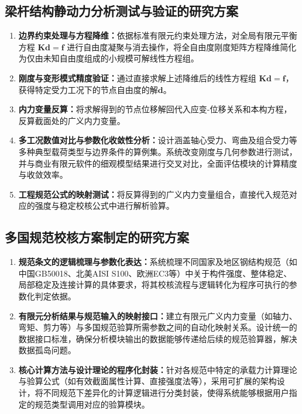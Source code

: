\subsection{梁杆结构静动力分析测试与验证的研究方案}
\begin{enumerate}[label=\arabic*., leftmargin=2em]
    \item \textbf{边界约束处理与方程降维：}依据标准有限元约束处理方法，对全局有限元平衡方程 \(\mathbf{K}\mathbf{d} = \mathbf{f}\) 进行自由度凝聚与消去操作，将全自由度刚度矩阵方程降维简化为仅由未知自由度组成的小规模可解线性方程组。
    \item \textbf{刚度与变形模式精度验证：}通过直接求解上述降维后的线性方程组 \(\mathbf{K}\mathbf{d} = \mathbf{f}\)，获得特定受力工况下的节点自由度的解\(\mathbf{d}\)。
    \item \textbf{内力变量反算：}将求解得到的节点位移解回代入应变-位移关系和本构方程，反算截面处的广义内力变量。
    \item \textbf{多工况数值对比与参数化收敛性分析：}设计涵盖轴心受力、弯曲及组合受力等多种典型载荷类型与边界条件的算例集。系统改变刚度与几何参数进行测试，并与商业有限元软件的细观模型结果进行交叉对比，全面评估模块的计算精度与收敛效率。
    \item \textbf{工程规范公式的映射测试：}将反算得到的广义内力变量组合，直接代入规范对应的强度与稳定校核公式中进行解析验算。
\end{enumerate}

\subsection{多国规范校核方案制定的研究方案}
\begin{enumerate}[label=\arabic*., leftmargin=2em]
    \item\textbf{规范条文的逻辑梳理与参数化表达：}系统梳理不同国家及地区钢结构规范（如中国GB50018、北美AISI S100、欧洲EC3等）中关于构件强度、整体稳定、局部稳定及连接计算的具体要求，将其校核流程与逻辑转化为程序可执行的参数化判定依据。
    \item\textbf{有限元分析结果与规范输入的映射接口：}建立有限元广义内力变量（如轴力、弯矩、剪力等）与多国规范验算所需参数之间的自动化映射关系。设计统一的数据接口标准，确保分析模块输出的数据能够传递给后续的规范验算器，解决数据孤岛问题。
    \item\textbf{核心计算方法与设计理论的程序化封装：}针对各规范中特定的承载力计算理论与验算公式（如有效截面属性计算、直接强度法等），采用可扩展的架构设计，将不同规范下差异化的计算逻辑进行分类封装，使得系统能够根据用户指定的规范类型调用对应的验算模块。
\end{enumerate}

